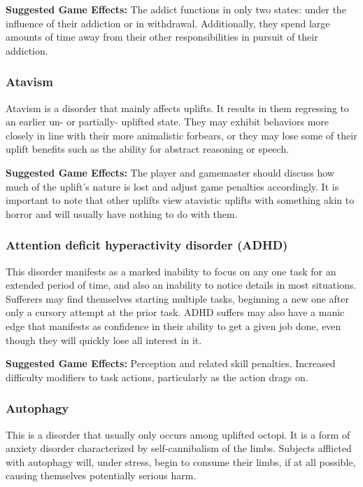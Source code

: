 \textbf{Suggested Game Effects:} The addict functions in only two states: under the influence of their addiction or in withdrawal. Additionally, they spend large amounts of time away from their other responsibilities in pursuit of their addiction. 

\subsubsection{Atavism} 

Atavism is a disorder that mainly affects uplifts. It results in them regressing to an earlier un- or partially- uplifted state. They may exhibit behaviors more closely in line with their more animalistic forbears, or they may lose some of their uplift benefits such as the ability for abstract reasoning or speech. 

\textbf{Suggested Game Effects:} The player and gamemaster should discuss how much of the uplift’s nature is lost and adjust game penalties accordingly. It is important to note that other uplifts view atavistic uplifts with something akin to horror and will usually have nothing to do with them. 

\subsubsection{Attention deficit hyperactivity disorder (ADHD)} 

This disorder manifests as a marked inability to focus on any one task for an extended period of time, and also an inability to notice details in most situations. Sufferers may find themselves starting multiple tasks, beginning a new one after only a cursory attempt at the prior task. ADHD suffers may also have a manic edge that manifests as confidence in their ability to get a given job done, even though they will quickly lose all interest in it. 

\textbf{Suggested Game Effects:} Perception and related skill penalties. Increased difficulty modifiers to task actions, particularly as the action drags on. 

\subsubsection{Autophagy} 

This is a disorder that usually only occurs among uplifted octopi. It is a form of anxiety disorder characterized by self-cannibalism of the limbs. Subjects afflicted with autophagy will, under stress, begin to consume their limbs, if at all possible, causing themselves potentially serious harm. 

